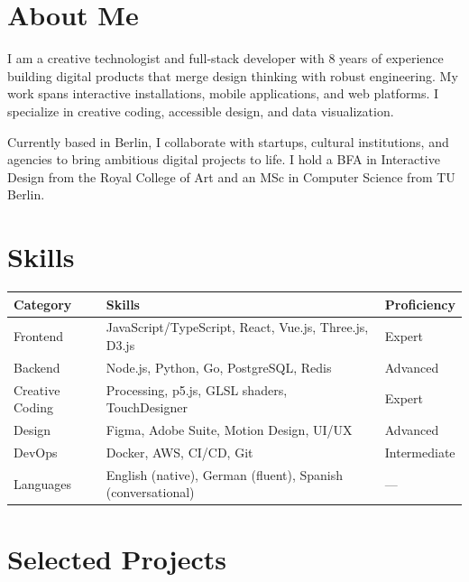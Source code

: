 \documentclass[
    language=english,
    doctype=personal-portfolio,
    institution=none,
]{../../omnilatex}
\begin{document}
\maketitle

\section{About Me}

I am a creative technologist and full-stack developer with 8 years of experience building digital products that merge design thinking with robust engineering. My work spans interactive installations, mobile applications, and web platforms. I specialize in creative coding, accessible design, and data visualization.

Currently based in Berlin, I collaborate with startups, cultural institutions, and agencies to bring ambitious digital projects to life. I hold a BFA in Interactive Design from the Royal College of Art and an MSc in Computer Science from TU Berlin.

\section{Skills}

\begin{center}
\begin{tabular}{|l|l|l|}
\hline
\textbf{Category} & \textbf{Skills} & \textbf{Proficiency} \\
\hline
Frontend & JavaScript/TypeScript, React, Vue.js, Three.js, D3.js & Expert \\
\hline
Backend & Node.js, Python, Go, PostgreSQL, Redis & Advanced \\
\hline
Creative Coding & Processing, p5.js, GLSL shaders, TouchDesigner & Expert \\
\hline
Design & Figma, Adobe Suite, Motion Design, UI/UX & Advanced \\
\hline
DevOps & Docker, AWS, CI/CD, Git & Intermediate \\
\hline
Languages & English (native), German (fluent), Spanish (conversational) & --- \\
\hline
\end{tabular}
\end{center}

\section{Selected Projects}
\end{document}

